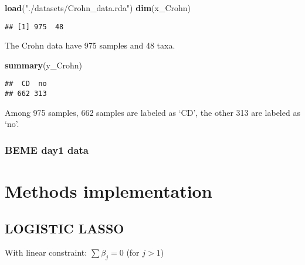\documentclass[]{book}
\newenvironment{Shaded}{\begin{snugshade}}{\end{snugshade}}
\newcommand{\KeywordTok}[1]{\textcolor[rgb]{0.13,0.29,0.53}{\textbf{#1}}}
\newcommand{\StringTok}[1]{\textcolor[rgb]{0.31,0.60,0.02}{#1}}
\newcommand{\NormalTok}[1]{#1}
\begin{document}
\begin{Shaded}
\begin{Highlighting}[]
\KeywordTok{load}\NormalTok{(}\StringTok{"./datasets/Crohn_data.rda"}\NormalTok{)}
\KeywordTok{dim}\NormalTok{(x_Crohn)}
\end{Highlighting}
\end{Shaded}

\begin{verbatim}
## [1] 975  48
\end{verbatim}

The Crohn data have 975 samples and 48 taxa.

\begin{Shaded}
\begin{Highlighting}[]
\KeywordTok{summary}\NormalTok{(y_Crohn)}
\end{Highlighting}
\end{Shaded}

\begin{verbatim}
##  CD  no 
## 662 313
\end{verbatim}

Among 975 samples, 662 samples are labeled as `CD', the other 313 are
labeled as `no'.

\subsection{BEME day1 data}\label{beme-day1-data}

\chapter{Methods implementation}\label{implem}

\section{LOGISTIC LASSO}\label{logistic-lasso}

With linear constraint: \(\sum \beta_{j} = 0\) (for \(j>1\))
\end{document}
